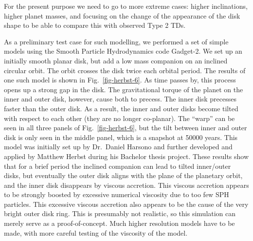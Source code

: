 \documentclass[10pt,fleqn,twoside]{article}
\begin{document}
For the present purpose we need to go to more extreme cases: higher
inclinations, higher planet masses, and focusing on the change of the
appearance of the disk shape to be able to compare this with observed Type 2
TDs.

As a preliminary test case for such modelling, we performed a set of simple
models using the Smooth Particle Hydrodynamics code Gadget-2. We set up an
initially smooth planar disk, but add a low mass companion on an inclined
circular orbit. The orbit crosses the disk twice each orbital period. The
results of one such model is shown in Fig.~\ref{fig-herbst-6}. As time
passes by, this process opens up a strong gap in the disk. The gravitational
torque of the planet on the inner and outer disk, however, cause both to
precess. The inner disk precesses faster than the outer disk. As a result,
the inner and outer disks become tilted with respect to each other (they are
no longer co-planar). The ``warp'' can be seen in all three panels of
Fig.~\ref{fig-herbst-6}, but the tilt between inner and outer disk is only
seen in the middle panel, which is a snapshot at 50000 years. This model was
initially set up by Dr.~Daniel Harsono and further developed and applied by
Matthew Herbst during his Bachelor thesis project. These results show that
for a brief period the inclined companion can lead to tilted inner/outer
disks, but eventually the outer disk aligns with the plane of the planetary
orbit, and the inner disk disappears by viscous accretion. This viscous
accretion appears to be strongly boosted by excessive numerical viscosity
due to too few SPH particles. This excessive viscous accretion also appears
to be the cause of the very bright outer disk ring. This is presumably not
realistic, so this simulation can merely serve as a proof-of-concept. Much
higher resolution models have to be made, with more careful testing of the
viscosity of the model.
\end{document}
